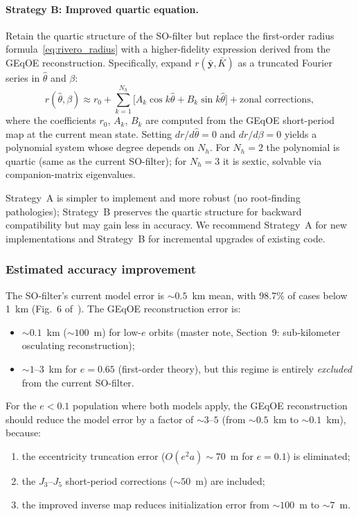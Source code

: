 \documentclass[11pt]{article}
\begin{document}
\paragraph{Strategy B: Improved quartic equation.}
Retain the quartic structure of the SO-filter but replace the first-order
radius formula~\eqref{eq:rivero_radius} with a higher-fidelity expression
derived from the GEqOE reconstruction. Specifically, expand
$r(\bar{\bm y}, \bar K)$ as a truncated Fourier series in $\hat\theta$ and
$\beta$:
\begin{equation}
r(\hat\theta, \beta) \approx r_0 + \sum_{k=1}^{N_h}
\bigl[A_k \cos k\hat\theta + B_k \sin k\hat\theta\bigr]
+ \text{zonal corrections},
\label{eq:improved_radius}
\end{equation}
where the coefficients $r_0$, $A_k$, $B_k$ are computed from the GEqOE
short-period map at the current mean state. Setting $dr/d\hat\theta = 0$ and
$dr/d\beta = 0$ yields a polynomial system whose degree depends on $N_h$.
For $N_h = 2$ the polynomial is quartic (same as the current SO-filter); for
$N_h = 3$ it is sextic, solvable via companion-matrix eigenvalues.

Strategy~A is simpler to implement and more robust (no root-finding
pathologies); Strategy~B preserves the quartic structure for backward
compatibility but may gain less in accuracy. We recommend Strategy~A for new
implementations and Strategy~B for incremental upgrades of existing code.

\subsubsection{Estimated accuracy improvement}

The SO-filter's current model error is $\sim\!0.5$~km mean, with 98.7\% of
cases below 1~km (Fig.~6 of~\cite{rivero2025}). The GEqOE reconstruction
error is:
\begin{itemize}
\item $\sim\!0.1$~km ($\sim\!100$~m) for low-$e$ orbits (master note,
Section~9: sub-kilometer osculating reconstruction);
\item $\sim\!1$--$3$~km for $e = 0.65$ (first-order theory), but this regime
is entirely \emph{excluded} from the current SO-filter.
\end{itemize}
For the $e < 0.1$ population where both models apply, the GEqOE
reconstruction should reduce the model error by a factor of $\sim\!3$--$5$
(from $\sim\!0.5$~km to $\sim\!0.1$~km), because:
\begin{enumerate}
\item the eccentricity truncation error ($O(e^2 a) \sim 70$~m for $e = 0.1$)
is eliminated;
\item the $J_3$--$J_5$ short-period corrections ($\sim\!50$~m) are included;
\item the improved inverse map reduces initialization error from
$\sim\!100$~m to $\sim\!7$~m.
\end{enumerate}
\end{document}
